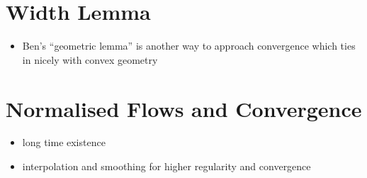 \section{Width Lemma}

\begin{itemize}
\item Ben's ``geometric lemma'' is another way to approach convergence which ties in nicely with convex geometry
\end{itemize}

\section{Normalised Flows and Convergence}

\begin{itemize}
\item long time existence
\item interpolation and smoothing for higher regularity and convergence
\end{itemize}